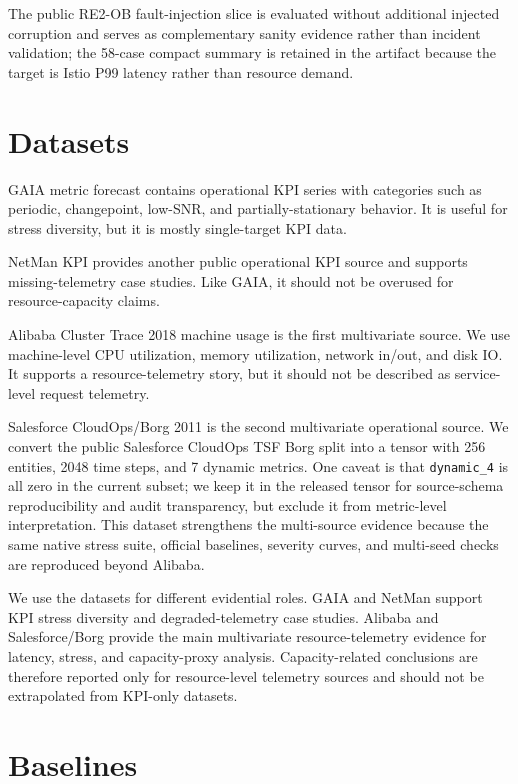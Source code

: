 \documentclass[conference]{IEEEtran}
\begin{document}


The public RE2-OB fault-injection slice is evaluated without additional injected corruption and serves as complementary sanity evidence rather than incident validation; the 58-case compact summary is retained in the artifact because the target is Istio P99 latency rather than resource demand.

\section{Datasets}

GAIA metric forecast \cite{gaia} contains operational KPI series with categories such as periodic, changepoint, low-SNR, and partially-stationary behavior. It is useful for stress diversity, but it is mostly single-target KPI data.

NetMan KPI \cite{netman} provides another public operational KPI source and supports missing-telemetry case studies. Like GAIA, it should not be overused for resource-capacity claims.

Alibaba Cluster Trace 2018 \cite{alibaba} machine usage is the first multivariate source. We use machine-level CPU utilization, memory utilization, network in/out, and disk IO. It supports a resource-telemetry story, but it should not be described as service-level request telemetry.

Salesforce CloudOps/Borg 2011 \cite{cloudops} is the second multivariate operational source. We convert the public Salesforce CloudOps TSF Borg split into a tensor with 256 entities, 2048 time steps, and 7 dynamic metrics. One caveat is that \texttt{dynamic\_4} is all zero in the current subset; we keep it in the released tensor for source-schema reproducibility and audit transparency, but exclude it from metric-level interpretation. This dataset strengthens the multi-source evidence because the same native stress suite, official baselines, severity curves, and multi-seed checks are reproduced beyond Alibaba.

We use the datasets for different evidential roles. GAIA and NetMan support KPI stress diversity and degraded-telemetry case studies. Alibaba and Salesforce/Borg provide the main multivariate resource-telemetry evidence for latency, stress, and capacity-proxy analysis. Capacity-related conclusions are therefore reported only for resource-level telemetry sources and should not be extrapolated from KPI-only datasets.

\section{Baselines}
\end{document}
